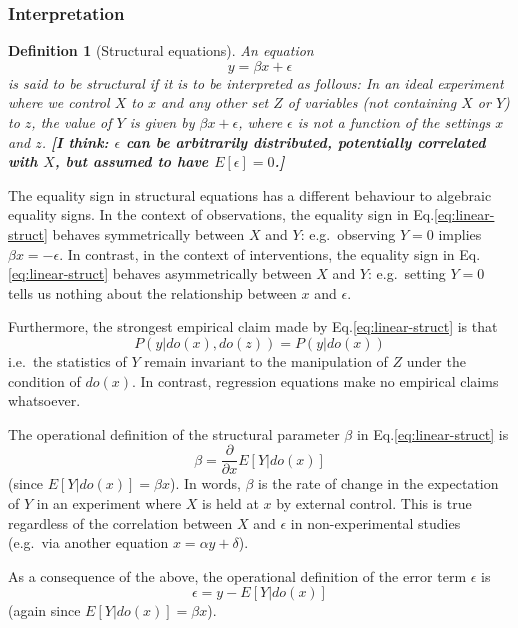 \documentclass[11pt]{article}
\numberwithin{equation}{section}
\newtheorem{defn}{Definition}[section]
\begin{document}
\subsubsection{Interpretation}

\begin{defn}[Structural equations]
An equation 
\begin{equation}
y=\beta x + \epsilon \label{eq:linear-struct}
\end{equation}
is said to be structural if it is to be interpreted as follows: In an ideal experiment where we control $X$ to $x$ and any other set $Z$ of variables (not containing $X$ or $Y$) to $z$, the value of $Y$ is given by $\beta x + \epsilon$, where $\epsilon$ is not a function of the settings $x$ and $z$. \textbf{[I think: $\epsilon$ can be arbitrarily distributed, potentially correlated with $X$, but assumed to have $E[\epsilon]=0$.]}
\end{defn}

The equality sign in structural equations has a different behaviour to algebraic equality signs. In the context of observations, the equality sign in Eq.\eqref{eq:linear-struct} behaves symmetrically between $X$ and $Y$: e.g.\ observing $Y=0$ implies $\beta x = -\epsilon$. In contrast, in the context of interventions, the equality sign in Eq.\eqref{eq:linear-struct} behaves asymmetrically between $X$ and $Y$: e.g.\ setting $Y=0$ tells us nothing about the relationship between $x$ and $\epsilon$. 

Furthermore, the strongest empirical claim made by Eq.\eqref{eq:linear-struct} is that
\begin{equation}
P(y|do(x), do(z)) = P(y|do(x))
\end{equation}
i.e.\ the statistics of $Y$ remain invariant to the manipulation of $Z$ under the condition of $do(x)$. In contrast, regression equations make no empirical claims whatsoever.

The operational definition of the structural parameter $\beta$ in Eq.\eqref{eq:linear-struct} is
\begin{equation}
\beta = \frac{\partial}{\partial x}E[Y|do(x)]
\end{equation}
(since $E[Y|do(x)]=\beta x$). In words, $\beta$ is the rate of change in the expectation of $Y$ in an experiment where $X$ is held at $x$ by external control. This is true regardless of the correlation between $X$ and $\epsilon$ in non-experimental studies (e.g.\ via another equation $x=\alpha y + \delta$).

As a consequence of the above, the operational definition of the error term $\epsilon$ is
\begin{equation}
\epsilon = y - E[Y|do(x)]
\end{equation}
(again since $E[Y|do(x)]=\beta x$). 
\end{document}
